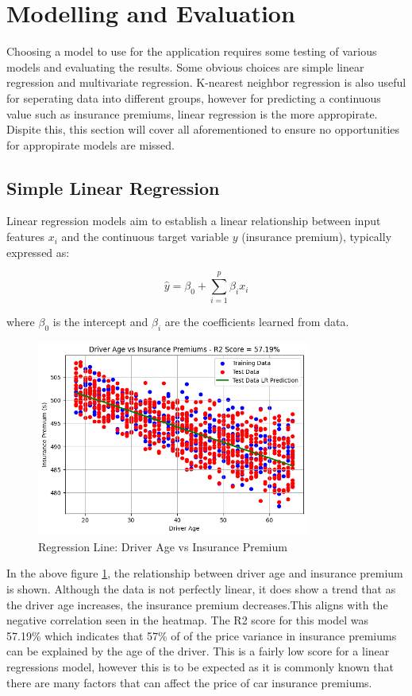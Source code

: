 \documentclass{article}
\begin{document}
\newpage
\section{Modelling and Evaluation}

Choosing a model to use for the application requires some testing of various models and evaluating the results. Some obvious choices are simple linear regression and multivariate regression. K-nearest neighbor regression is also useful for seperating data into different groups, however for predicting a continuous value such as insurance premiums, linear regression is the more appropirate. Dispite this, this section will cover all aforementioned to ensure no opportunities for appropirate models are missed.

\subsection{Simple Linear Regression}
Linear regression models aim to establish a linear relationship between input features $x_i$ and the continuous target variable $y$ (insurance premium), typically expressed as:

$$
\hat{y} = \beta_0 + \sum_{i=1}^p \beta_i x_i
$$

where $\beta_0$ is the intercept and $\beta_i$ are the coefficients learned from data\cite{hastie_09_elements-of.statistical-learning}.



\begin{figure}[h]
\centering
\includegraphics[width=0.8\textwidth]{age_insurance_LR.png}
\caption{Regression Line: Driver Age vs Insurance Premium}\label{fig:regression_age}
\end{figure}
In the above figure \ref{fig:regression_age}, the relationship between driver age and insurance premium is shown. Although the data is not perfectly linear, it does show a trend that as the driver age increases, the insurance premium decreases.This aligns with the negative correlation seen in the heatmap. The R2 score for this model was 57.19\% which indicates that 57\% of of the price variance in insurance premiums can be explained by the age of the driver. This is a fairly low score for a linear regressions model, however this is to be expected as it is commonly known that there are many factors that can affect the price of car insurance premiums.
\end{document}
